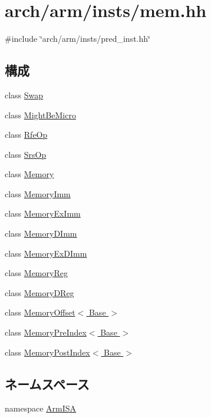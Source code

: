 \hypertarget{arm_2insts_2mem_8hh}{
\section{arch/arm/insts/mem.hh}
\label{arm_2insts_2mem_8hh}
}
{\ttfamily \#include \char`\"{}arch/arm/insts/pred\_\-inst.hh\char`\"{}}\par
\subsection*{構成}
\begin{DoxyCompactItemize}
\item 
class \hyperlink{classArmISA_1_1Swap}{Swap}
\item 
class \hyperlink{classArmISA_1_1MightBeMicro}{MightBeMicro}
\item 
class \hyperlink{classArmISA_1_1RfeOp}{RfeOp}
\item 
class \hyperlink{classArmISA_1_1SrsOp}{SrsOp}
\item 
class \hyperlink{classArmISA_1_1Memory}{Memory}
\item 
class \hyperlink{classArmISA_1_1MemoryImm}{MemoryImm}
\item 
class \hyperlink{classArmISA_1_1MemoryExImm}{MemoryExImm}
\item 
class \hyperlink{classArmISA_1_1MemoryDImm}{MemoryDImm}
\item 
class \hyperlink{classArmISA_1_1MemoryExDImm}{MemoryExDImm}
\item 
class \hyperlink{classArmISA_1_1MemoryReg}{MemoryReg}
\item 
class \hyperlink{classArmISA_1_1MemoryDReg}{MemoryDReg}
\item 
class \hyperlink{classArmISA_1_1MemoryOffset}{MemoryOffset$<$ Base $>$}
\item 
class \hyperlink{classArmISA_1_1MemoryPreIndex}{MemoryPreIndex$<$ Base $>$}
\item 
class \hyperlink{classArmISA_1_1MemoryPostIndex}{MemoryPostIndex$<$ Base $>$}
\end{DoxyCompactItemize}
\subsection*{ネームスペース}
\begin{DoxyCompactItemize}
\item 
namespace \hyperlink{namespaceArmISA}{ArmISA}
\end{DoxyCompactItemize}
